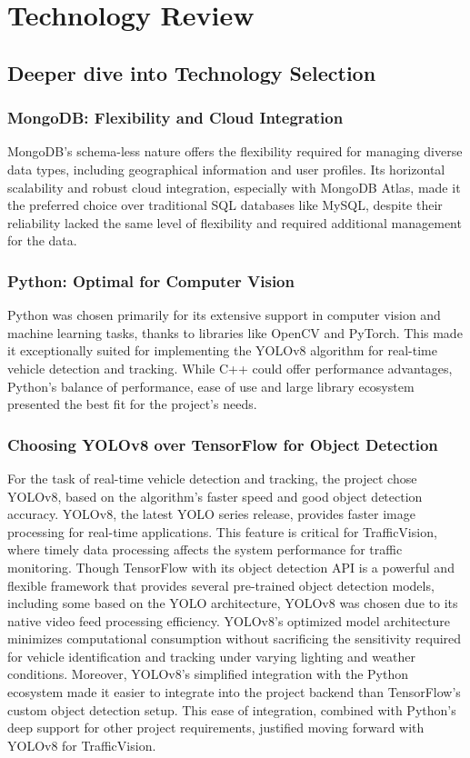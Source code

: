 \chapter{Technology Review}

\section{Deeper dive into Technology Selection}

\subsection{MongoDB: Flexibility and Cloud Integration} MongoDB's\cite{mongodb2021} schema-less nature offers the flexibility required for managing diverse data types, including geographical information and user profiles. Its horizontal scalability and robust cloud integration, especially with MongoDB Atlas, made it the preferred choice over traditional SQL databases like MySQL, despite their reliability lacked the same level of flexibility and required additional management for the data. 

\subsection{Python: Optimal for Computer Vision} Python\cite{vanrossum2009} was chosen primarily for its extensive support in computer vision and machine learning tasks, thanks to libraries like OpenCV\cite{bradski2000opencv} and PyTorch. This made it exceptionally suited for implementing the YOLOv8 algorithm for real-time vehicle detection and tracking. While C++ could offer performance advantages, Python's balance of performance, ease of use and large library ecosystem presented the best fit for the project's needs. 

\subsection{Choosing YOLOv8\cite{redmon2018yolov3} over TensorFlow for Object Detection} For the task of real-time vehicle detection and tracking, the project chose YOLOv8, based on the algorithm's faster speed and good object detection accuracy. YOLOv8, the latest YOLO series release, provides faster image processing for real-time applications. This feature is critical for TrafficVision, where timely data processing affects the system performance for traffic monitoring. Though TensorFlow with its object detection API is a powerful and flexible framework that provides several pre-trained object detection models, including some based on the YOLO architecture, YOLOv8 was chosen due to its native video feed processing efficiency. YOLOv8's optimized model architecture minimizes computational consumption without sacrificing the sensitivity required for vehicle identification and tracking under varying lighting and weather conditions. Moreover, YOLOv8's simplified integration with the Python ecosystem made it easier to integrate into the project backend than TensorFlow's custom object detection setup. This ease of integration, combined with Python's deep support for other project requirements, justified moving forward with YOLOv8 for TrafficVision.

